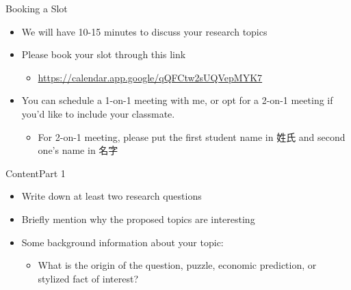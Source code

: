 \documentclass[hyperref={pdfpagelabels=false}]{beamer}
\begin{document}
\begin{frame}{Booking a Slot}
	\begin{itemize} 
	
		\item We will have 10-15 minutes to discuss your research topics
		\vspace{0.2cm}
		\item Please book your slot through this link
		\vspace{0.2cm}
		\begin{itemize} 
			\item \url{https://calendar.app.google/qQFCtw2sUQVepMYK7}
			
		\end{itemize}
		\vspace{0.2cm}
		\item You can schedule a 1-on-1 meeting with me, or opt for a 2-on-1 meeting if you'd like to include your classmate. 
	\vspace{0.2cm}
	\begin{itemize} 
		\item For 2-on-1 meeting, please put the first student name in 姓氏 and second one's name in 名字
		
	\end{itemize}
		\vspace{0.2cm}
			
		
	\end{itemize}
\end{frame}







\begin{frame}{Content}{Part 1}
	\begin{itemize} 
		\item Write down at least two research questions
		\vspace{0.2cm}
		\item Briefly mention why the proposed topics are interesting 
		\vspace{0.2cm}
		\item Some background information about your topic: 
		\vspace{0.2cm}
		\begin{itemize}
			\item What is the origin of the question, puzzle, economic prediction, or stylized fact of interest?
		\end{itemize}
		
		
		
		
	\end{itemize}
\end{frame}
\end{document}
